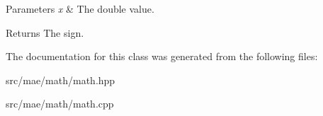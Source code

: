 \begin{DoxyParams}{Parameters}
{\em x} & The double value. \\
\hline
\end{DoxyParams}
\begin{DoxyReturn}{Returns}
The sign. 
\end{DoxyReturn}


The documentation for this class was generated from the following files\-:\begin{DoxyCompactItemize}
\item 
src/mae/math/math.\-hpp\item 
src/mae/math/math.\-cpp\end{DoxyCompactItemize}
